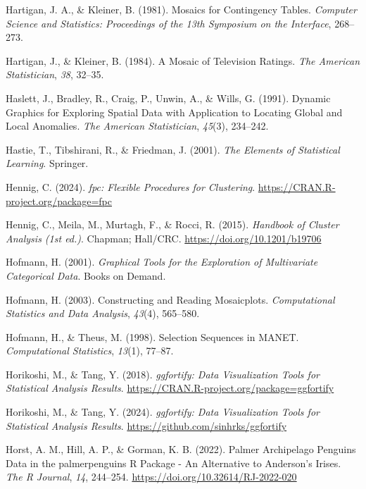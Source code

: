 \documentclass[
  letterpaper,
]{krantz}
\newlength{\cslhangindent}
\newenvironment{CSLReferences}[2] %
 {\begin{list}{}{%
  \setlength{\itemindent}{0pt}
  \setlength{\leftmargin}{0pt}
  \setlength{\parsep}{0pt}
  \ifodd #1
   \setlength{\leftmargin}{\cslhangindent}
   \setlength{\itemindent}{-1\cslhangindent}
  \fi
  \setlength{\itemsep}{#2\baselineskip}}}
 {\end{list}}
\begin{document}
\begin{CSLReferences}{1}{0}
Hartigan, J. A., \& Kleiner, B. (1981). Mosaics for {C}ontingency
{T}ables. \emph{Computer Science and Statistics: Proceedings of the 13th
Symposium on the Interface}, 268--273.

Hartigan, J., \& Kleiner, B. (1984). A {M}osaic of {T}elevision
{R}atings. \emph{The American Statistician}, \emph{38}, 32--35.

Haslett, J., Bradley, R., Craig, P., Unwin, A., \& Wills, G. (1991).
{D}ynamic {G}raphics for {E}xploring {S}patial {D}ata with {A}pplication
to {L}ocating {G}lobal and {L}ocal {A}nomalies. \emph{The American
Statistician}, \emph{45}(3), 234--242.

Hastie, T., Tibshirani, R., \& Friedman, J. (2001). \emph{The {E}lements
of {S}tatistical {L}earning}. Springer.

Hennig, C. (2024). \emph{{fpc}: {F}lexible {P}rocedures for
{C}lustering}. \url{https://CRAN.R-project.org/package=fpc}

Hennig, C., Meila, M., Murtagh, F., \& Rocci, R. (2015). \emph{Handbook
of {C}luster {A}nalysis (1st ed.)}. Chapman; Hall/CRC.
\url{https://doi.org/10.1201/b19706}

Hofmann, H. (2001). \emph{Graphical {T}ools for the {E}xploration of
{M}ultivariate {C}ategorical {D}ata}. Books on Demand.

Hofmann, H. (2003). Constructing and {R}eading {M}osaicplots.
\emph{Computational Statistics and Data Analysis}, \emph{43}(4),
565--580.

Hofmann, H., \& Theus, M. (1998). Selection {S}equences in {MANET}.
\emph{Computational Statistics}, \emph{13}(1), 77--87.

Horikoshi, M., \& Tang, Y. (2018). \emph{{ggfortify}: {D}ata
{V}isualization {T}ools for {S}tatistical {A}nalysis {R}esults}.
\url{https://CRAN.R-project.org/package=ggfortify}

Horikoshi, M., \& Tang, Y. (2024). \emph{{ggfortify}: {D}ata
{V}isualization {T}ools for {S}tatistical {A}nalysis {R}esults}.
\url{https://github.com/sinhrks/ggfortify}

Horst, A. M., Hill, A. P., \& Gorman, K. B. (2022). Palmer {A}rchipelago
{P}enguins {D}ata in the palmerpenguins {R} {P}ackage - {A}n
{A}lternative to {A}nderson's {I}rises. \emph{The R Journal}, \emph{14},
244--254. \url{https://doi.org/10.32614/RJ-2022-020}


\end{CSLReferences}
\end{document}

